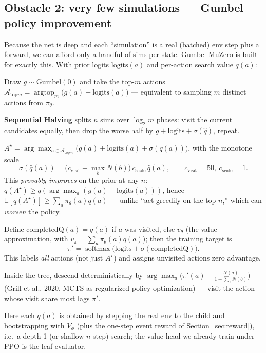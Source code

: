 \documentclass[11pt]{article}
\newcommand{\E}{\mathbb{E}}
\newcommand{\softmax}{\operatorname{softmax}}
\newcommand{\pol}{\pi_\theta}
\begin{document}
\subsection{Obstacle 2: very few simulations --- Gumbel policy improvement}
Because the net is deep and each ``simulation'' is a real (batched) env step plus a forward, we can
afford only a handful of sims per state. Gumbel MuZero is built for exactly this. With prior logits
$\mathrm{logits}(a)$ and per-action search value $q(a)$:
\begin{description}[nosep,leftmargin=1.4em]
\item[Root sampling.] Draw $g\sim\mathrm{Gumbel}(0)$ and take the top-$m$ actions
$\mathcal A_{\mathrm{top}m}=\operatorname{argtop}_m\!\big(g(a)+\mathrm{logits}(a)\big)$ --- equivalent to
sampling $m$ distinct actions from $\pol$.
\item[Budget allocation.] \textbf{Sequential Halving} splits $n$ sims over $\log_2 m$ phases: visit the
current candidates equally, then drop the worse half by $g+\mathrm{logits}+\sigma(\hat q)$, repeat.
\item[Action chosen / guarantee.] $A^\star=\arg\max_{a\in\mathcal A_{\mathrm{top}m}}\!\big(g(a)+
\mathrm{logits}(a)+\sigma(q(a))\big)$, with the monotone scale
\begin{equation}
\sigma(\hat q(a)) = \big(c_{\mathrm{visit}} + \max_b N(b)\big)\,c_{\mathrm{scale}}\,\hat q(a),
\qquad c_{\mathrm{visit}}{=}50,\ c_{\mathrm{scale}}{=}1.
\end{equation}
This \emph{provably improves} on the prior at any $n$: $q(A^\star)\ge q(\arg\max_a(g(a)+\mathrm{logits}(a)))$,
hence $\E[q(A^\star)]\ge\sum_a\pol(a)q(a)$ --- unlike ``act greedily on the top-$n$,'' which can
\emph{worsen} the policy.
\item[Improved-policy target (completed $Q$).] Define
$\mathrm{completedQ}(a)=q(a)$ if $a$ was visited, else $v_\theta$ (the value approximation, with
$v_\pi=\sum_a\pol(a)q(a)$); then the training target is
\begin{equation}
\pi'=\softmax\!\big(\mathrm{logits}+\sigma(\mathrm{completedQ})\big).
\label{eq:gumbel-target}
\end{equation}
This labels \emph{all} actions (not just $A^\star$) and assigns unvisited actions zero advantage.
\item[Non-root selection.] Inside the tree, descend deterministically by
$\arg\max_a\big(\pi'(a)-\tfrac{N(a)}{1+\sum_b N(b)}\big)$ (Grill et al., 2020, MCTS as regularized
policy optimization) --- visit the action whose visit share most lags $\pi'$.
\end{description}
Here each $q(a)$ is obtained by stepping the real env to the child and bootstrapping with $V_\phi$ (plus
the one-step event reward of Section~\ref{sec:reward}), i.e.\ a depth-1 (or shallow $n$-step) search; the
value head we already train under PPO is the leaf evaluator.
\end{document}
